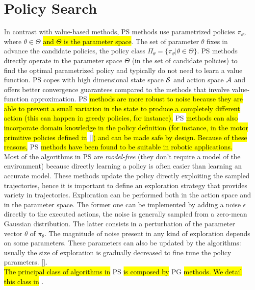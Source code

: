 \section{Policy Search}\label{sec:ps}
In contrast with value-based methods, \acf{PS} methods use parametrized policies $\pi_{\theta}$, where $\theta \in \Theta$ \hl{and $\Theta$ is the parameter space}. The set of parameter $\theta$ fixes in advance the candidate policies, \ie the policy class $\Pi_{\theta} = \{ \pi_{\theta} | \theta \in \Theta \}$. \ac{PS} methods directly operate in the parameter space $\Theta$ (\ie in the set of candidate policies) to find the optimal parametrized policy and typically do not need to learn a value function. \ac{PS} copes with high dimensional state space $\mathcal{S}$ and action space $\mathcal{A}$ and offers better convergence guarantees compared to the methods that involve value-function approximation. \ac{PS} \hl{methods are more robust to noise because they are able to prevent a small variation in the state to produce a completely different action (this can happen in greedy policies, for instance).} \ac{PS} \hl{methods can also incorporate domain knowledge in the policy definition (for instance, in the motor primitive policies defined in} [\cite{Peters2008ReinforcementLO}]\hl{) and can be made safe by design. Because of these reasons,} \ac{PS} \hl{methods have been found to be suitable in robotic applications.}\\
\newline
Most of the algorithms in \ac{PS} are \emph{model-free} (\ie they don't require a model of the environment) because directly learning a policy is often easier than learning an accurate model. These methods update the policy directly exploiting the sampled trajectories, hence it is important to define an exploration strategy that provides variety in trajectories. Exploration can be performed both in the action space and in the parameter space. The former one can be implemented by adding a noise $\epsilon$ directly to the executed actions, the noise is generally sampled from a zero-mean Gaussian distribution. The latter consists in a perturbation of the parameter vector $\theta$ of $\pi_{\theta}$. The magnitude of noise present in any kind of exploration depends on some parameters. These parameters can also be updated by the algorithms: usually the size of exploration is gradually decreased to fine tune the policy parameters. [\cite{deisenroth2013Survey}].\\
\newline
\hl{The principal class of algorithms in} \ac{PS} \hl{is composed by} \acf{PG} \hl{methods. We detail this class in} .

